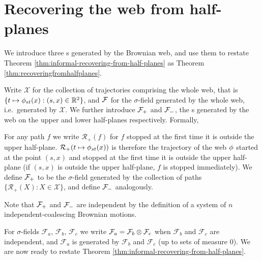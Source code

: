 \newcommand{\indepbm}{\psi}
\newcommand{\toinP}{\overset{\P}\to}
\newcommand{\statementoflemresampledetosampled}{$\resamplede \toinP \sampled$ as $\epsilon \to 0$}

\newcommand{\statewebO}{S_{\webnoargs}}
\newcommand{\statenowebO}{S_{\indepbm}}
\newcommand{\trajs}{\mathcal{X}}
{
\section{Recovering the web from half-planes}
\label{sec:recovering-from-half-planes}

We introduce three \sigfield{}s generated by the Brownian web, and use
them to restate Theorem \ref{thm:informal-recovering-from-half-planes}
as Theorem \ref{thm:recoveringfromhalfplanes}.

\newcommand{\restrictupper}{\mathcal{R}_{+}}

  Write $\trajs$ for the collection of trajectories comprising the whole web,
  that is $\{t \mapsto \phi_{{s}{t}}(x) : (s,x) \in \mathbb{R}^2\}$,
  and $\mathcal{F}$ for the $\sigma$-field generated by the
  whole web, i.e.\ generated by $\trajs$.
  We further introduce $\mathcal{F}_{+}$ and $\mathcal{F}_{-}$, the \sigfield{}s
  generated by the web on the upper and lower half-planes
  respectively.  Formally,

  \begin{definition*}
  For any path $f$ we write $\restrictupper(f)$ for $f$ stopped at the
  first time it is outside the upper half-plane.
  $\restrictupper(t \mapsto \web{s}{t}{x})$ is therefore the trajectory of the
  web $\phi$ started at the point $(s,x)$ and stopped at the first
  time it is outside the upper half-plane (if $(s,x)$ is outside the
  upper half-plane, $f$ is stopped immediately).
  We define $\mathcal{F}_{+}$ to be the $\sigma$-field generated by the
  collection of paths $\{\restrictupper(X) : X \in \trajs \}$, and define $\mathcal{F}_{-}$ analogously.
  \end{definition*}

  Note that $\mathcal{F}_{+}$ and $\mathcal{F}_{-}$ are independent by the definition of
  a system of $n$ independent-coalescing Brownian motions.

  \newcommand{\F}{\mathcal{F}}
  For $\sigma$-fields $\F_a$, $\F_b$, $\F_c$ we write $\F_a = \F_b
  \tensor \F_c$ when $\F_b$ and $\F_c$ are independent, and $\F_a$
  is generated by $\F_b$ and $\F_c$ (up to sets of measure $0$).
  We are now ready to restate Theorem
  \ref{thm:informal-recovering-from-half-planes}.

}
